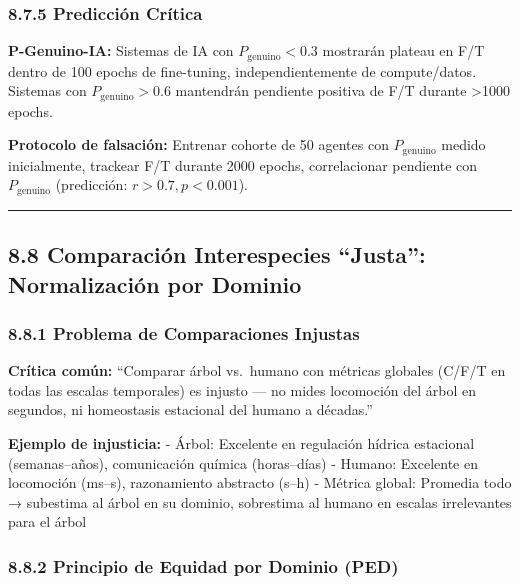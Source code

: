 \subsubsection{8.7.5 Predicción Crítica}\label{predicciuxf3n-cruxedtica}

\textbf{P-Genuino-IA:} Sistemas de IA con \(P_{\text{genuino}} < 0.3\)
mostrarán plateau en F/T dentro de 100 epochs de fine-tuning,
independientemente de compute/datos. Sistemas con
\(P_{\text{genuino}} > 0.6\) mantendrán pendiente positiva de F/T
durante \textgreater1000 epochs.

\textbf{Protocolo de falsación:} Entrenar cohorte de 50 agentes con
\(P_{\text{genuino}}\) medido inicialmente, trackear F/T durante 2000
epochs, correlacionar pendiente con \(P_{\text{genuino}}\) (predicción:
\(r > 0.7, p < 0.001\)).

\begin{center}\rule{0.5\linewidth}{0.5pt}\end{center}

\subsection{8.8 Comparación Interespecies ``Justa'': Normalización por
Dominio}\label{comparaciuxf3n-interespecies-justa-normalizaciuxf3n-por-dominio}

\subsubsection{8.8.1 Problema de Comparaciones
Injustas}\label{problema-de-comparaciones-injustas}

\textbf{Crítica común:} ``Comparar árbol vs.~humano con métricas
globales (C/F/T en todas las escalas temporales) es injusto --- no mides
locomoción del árbol en segundos, ni homeostasis estacional del humano a
décadas.''

\textbf{Ejemplo de injusticia:} - Árbol: Excelente en regulación hídrica
estacional (semanas--años), comunicación química (horas--días) - Humano:
Excelente en locomoción (ms--s), razonamiento abstracto (s--h) - Métrica
global: Promedia todo → subestima al árbol en su dominio, sobrestima al
humano en escalas irrelevantes para el árbol

\subsubsection{8.8.2 Principio de Equidad por Dominio
(PED)}\label{principio-de-equidad-por-dominio-ped}

